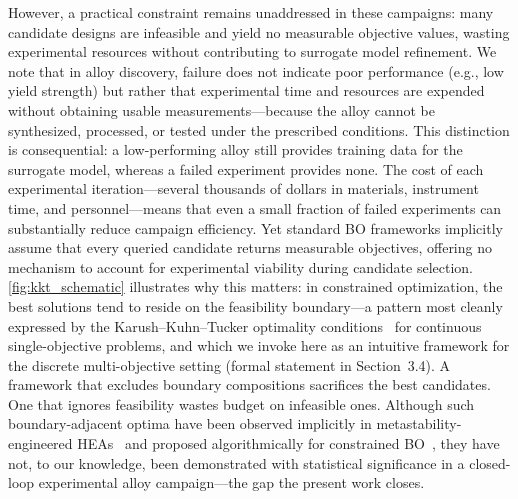 \documentclass[preprint,12pt,times]{elsarticle}  %
\begin{document}

However, a practical constraint remains unaddressed in these campaigns: many candidate designs are infeasible and yield no measurable objective values, wasting experimental resources without contributing to surrogate model refinement. We note that in alloy discovery, failure does not indicate poor performance (e.g., low yield strength) but rather that experimental time and resources are expended without obtaining usable measurements---because the alloy cannot be synthesized, processed, or tested under the prescribed conditions. This distinction is consequential: a low-performing alloy still provides training data for the surrogate model, whereas a failed experiment provides none. The cost of each experimental iteration---several thousands of dollars in materials, instrument time, and personnel---means that even a small fraction of failed experiments can substantially reduce campaign efficiency. Yet standard BO frameworks implicitly assume that every queried candidate returns measurable objectives, offering no mechanism to account for experimental viability during candidate selection. \autoref{fig:kkt_schematic} illustrates why this matters: in constrained optimization, the best solutions tend to reside on the feasibility boundary---a pattern most cleanly expressed by the Karush--Kuhn--Tucker optimality conditions~\cite{nocedal2006numerical} for continuous single-objective problems, and which we invoke here as an intuitive framework for the discrete multi-objective setting (formal statement in Section~3.4). A framework that excludes boundary compositions sacrifices the best candidates. One that ignores feasibility wastes budget on infeasible ones. Although such boundary-adjacent optima have been observed implicitly in metastability-engineered HEAs~\cite{li2016metastable} and proposed algorithmically for constrained BO~\cite{tian2024boundary, maguire2025good}, they have not, to our knowledge, been demonstrated with statistical significance in a closed-loop experimental alloy campaign---the gap the present work closes.
\end{document}
